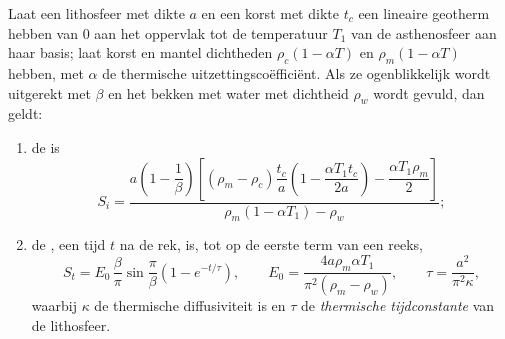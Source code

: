 \begin{proposition}\label{prop:b2:basins-compared:stretching}
Laat een lithosfeer met dikte $a$ en een korst met dikte $t_c$ een lineaire geotherm hebben van
$0$ aan het oppervlak tot de temperatuur $T_1$ van de asthenosfeer aan haar basis; laat korst en mantel
dichtheden $\rho_c(1 - \alpha T)$ en $\rho_m(1 - \alpha T)$ hebben, met $\alpha$ de thermische
uitzettingscoëfficiënt. Als ze ogenblikkelijk wordt uitgerekt met $\beta$ en het bekken met
water met dichtheid $\rho_w$ wordt gevuld, dan geldt:
\begin{enumerate}
  \item de  is
  \[
    S_i = \frac{a\left(1 - \dfrac{1}{\beta}\right)\left[(\rho_m - \rho_c)\dfrac{t_c}{a}
          \left(1 - \dfrac{\alpha T_1 t_c}{2a}\right) - \dfrac{\alpha T_1 \rho_m}{2}\right]}
          {\rho_m(1 - \alpha T_1) - \rho_w};
  \]
  \item de , een tijd $t$ na de rek, is, tot op de eerste term van een reeks,
  \[
    S_t = E_0\,\frac{\beta}{\pi}\sin\frac{\pi}{\beta}\left(1 - e^{-t/\tau}\right),\qquad
    E_0 = \frac{4a\rho_m\alpha T_1}{\pi^2(\rho_m - \rho_w)},\qquad
    \tau = \frac{a^2}{\pi^2\kappa},
  \]
  waarbij $\kappa$ de thermische diffusiviteit is en $\tau$ de \emph{thermische
tijdconstante} van de lithosfeer.
\end{enumerate}
\end{proposition}

